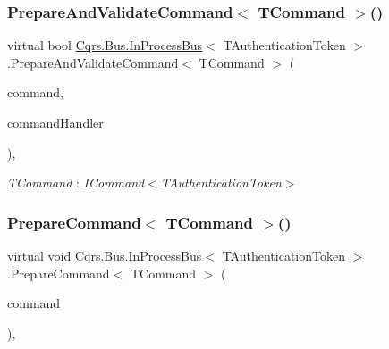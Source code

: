 \subsubsection{\texorpdfstring{Prepare\+And\+Validate\+Command$<$ T\+Command $>$()}{PrepareAndValidateCommand< TCommand >()}}
{\footnotesize\ttfamily virtual bool \hyperlink{classCqrs_1_1Bus_1_1InProcessBus}{Cqrs.\+Bus.\+In\+Process\+Bus}$<$ T\+Authentication\+Token $>$.Prepare\+And\+Validate\+Command$<$ T\+Command $>$ (\begin{DoxyParamCaption}\item[{T\+Command}]{command,  }\item[{out \hyperlink{classCqrs_1_1Bus_1_1RouteHandlerDelegate}{Route\+Handler\+Delegate}}]{command\+Handler }\end{DoxyParamCaption})\hspace{0.3cm}{\ttfamily [protected]}, {\ttfamily [virtual]}}

\begin{Desc}
\item[Type Constraints]\begin{description}
\item[{\em T\+Command} : {\em I\+Command$<$T\+Authentication\+Token$>$}]\end{description}
\end{Desc}
\mbox{\label{classCqrs_1_1Bus_1_1InProcessBus_ab0064808b1b619bee57fa5eff49bfca7}} 
\subsubsection{\texorpdfstring{Prepare\+Command$<$ T\+Command $>$()}{PrepareCommand< TCommand >()}}
{\footnotesize\ttfamily virtual void \hyperlink{classCqrs_1_1Bus_1_1InProcessBus}{Cqrs.\+Bus.\+In\+Process\+Bus}$<$ T\+Authentication\+Token $>$.Prepare\+Command$<$ T\+Command $>$ (\begin{DoxyParamCaption}\item[{T\+Command}]{command }\end{DoxyParamCaption})\hspace{0.3cm}{\ttfamily [protected]}, {\ttfamily [virtual]}}

